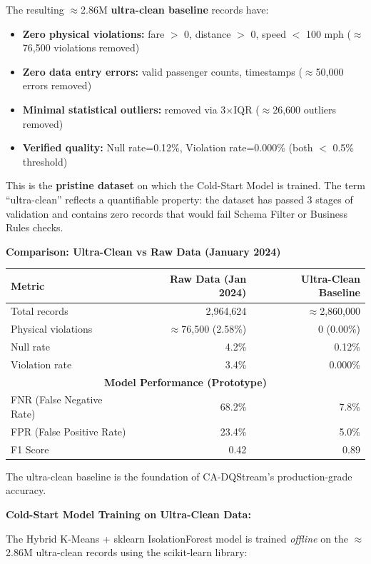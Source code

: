 The resulting $\approx$2.86M \textbf{ultra-clean baseline} records have:
\begin{itemize}
    \item \textbf{Zero physical violations:} fare $>$ 0, distance $>$ 0, speed $<$ 100 mph ($\approx$76,500 violations removed)
    \item \textbf{Zero data entry errors:} valid passenger counts, timestamps ($\approx$50,000 errors removed)
    \item \textbf{Minimal statistical outliers:} removed via 3$\times$IQR ($\approx$26,600 outliers removed)
    \item \textbf{Verified quality:} Null rate=0.12\%, Violation rate=0.000\% (both $<$ 0.5\% threshold)
\end{itemize}

This is the \textbf{pristine dataset} on which the Cold-Start Model is trained. The term ``ultra-clean'' reflects a quantifiable property: the dataset has passed 3 stages of validation and contains zero records that would fail Schema Filter or Business Rules checks.

\textbf{Comparison: Ultra-Clean vs Raw Data (January 2024)}

\begin{center}
\begin{tabular}{|l|r|r|}
\hline
\textbf{Metric} & \textbf{Raw Data (Jan 2024)} & \textbf{Ultra-Clean Baseline} \\
\hline
Total records & 2,964,624 & $\approx$2,860,000 \\
Physical violations & $\approx$76,500 (2.58\%) & 0 (0.00\%) \\
Null rate & 4.2\% & 0.12\% \\
Violation rate & 3.4\% & 0.000\% \\
\hline
\multicolumn{3}{|c|}{\textbf{Model Performance (Prototype)}} \\
\hline
FNR (False Negative Rate) & 68.2\% & 7.8\% \\
FPR (False Positive Rate) & 23.4\% & 5.0\% \\
F1 Score & 0.42 & 0.89 \\
\hline
\end{tabular}
\end{center}

The ultra-clean baseline is the foundation of CA-DQStream's production-grade accuracy.

\textbf{Cold-Start Model Training on Ultra-Clean Data:}

The Hybrid K-Means + sklearn IsolationForest model is trained \emph{offline} on the $\approx$2.86M ultra-clean records using the scikit-learn library:

